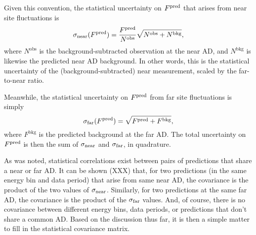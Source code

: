 \documentclass[../thesis.tex]{subfiles}
\begin{document}
Given this convention, the statistical uncertainty on $F^{\mathrm{pred}}$ that arises from near site fluctuations is
\begin{equation*}
  \sigma_{\mathrm{near}}(F^{\mathrm{pred}}) = \frac{F^{\mathrm{pred}}}{N^{\mathrm{obs}}} \sqrt{N^{\mathrm{obs}} + N^{\mathrm{bkg}}},
\end{equation*}
where $N^{\mathrm{obs}}$ is the background-subtracted observation at the near AD, and $N^{\mathrm{bkg}}$ is likewise the predicted near AD background. In other words, this is the statistical uncertainty of the (background-subtracted) near measurement, scaled by the far-to-near ratio.

Meanwhile, the statistical uncertainty on $F^{\mathrm{pred}}$ from far site fluctuations is simply
\begin{equation*}
  \sigma_{\mathrm{far}}(F^{\mathrm{pred}}) = \sqrt{F^{\mathrm{pred}} + F^{\mathrm{bkg}}},
\end{equation*}
where $F^{\mathrm{bkg}}$ is the predicted background at the far AD. The total uncertainty on $F^{\mathrm{pred}}$ is then the sum of $\sigma_{\mathrm{near}}$ and $\sigma_{\mathrm{far}}$, in quadrature.

As was noted, statistical correlations exist between pairs of predictions that share a near or far AD. It can be shown (XXX) that, for two predictions (in the same energy bin and data period) that arise from same near AD, the covariance is the product of the two values of $\sigma_{\mathrm{near}}$. Similarly, for two predictions at the same far AD, the covariance is the product of the $\sigma_{\mathrm{far}}$ values. And, of course, there is no covariance between different energy bins, data periods, or predictions that don't share a common AD. Based on the discussion thus far, it is then a simple matter to fill in the statistical covariance matrix.

\begin{comment}
In the fit, we compare the far site measurement to the far site prediction as obtained from the near sites. Statistical uncertainty arises from both the near sites (in the form of fluctuations in the far site prediction) and from the far site data itself. We have the two expressions for each component.

Without affecting the fit, we can simplify the situation by assigning both components of the statistical uncertainty to the far site \emph{predictions}, with no error bars on the far site data.

The predictions at the same far AD, but from different near ADs, are statistically correlated via the statistical fluctuations at the far AD. The resulting covariance is the product of the two $\sigma_{\mathrm{far}}$.

Likewise, the predictions at different far ADs, but from the same near AD, are correlated via the fluctuations at the near AD. This gives a covariance of the product of the two $\sigma_{\mathrm{near}}$.

I don't know how to prove these claims about the covariances.

From this we can straightforwardly generalize to the full statistical covariance matrix across all ADs, energy bins, and data periods.
\end{comment}
\end{document}
